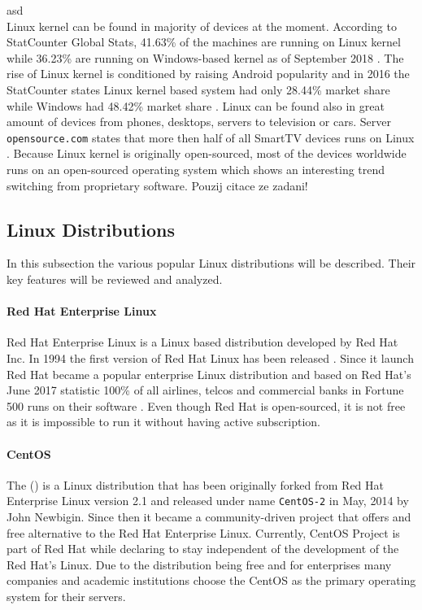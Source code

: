 asd\\
Linux kernel can be found in majority of devices at the moment. According to StatCounter Global Stats, 41.63\% of the machines are running on Linux kernel while 36.23\% are running on Windows-based kernel as of September 2018 \cite{StatCounter}. The rise of Linux kernel is conditioned by raising Android popularity and in 2016 the StatCounter states Linux kernel based system had only 28.44\% market share while Windows had 48.42\% market share \cite{StatCounter}. Linux can be found also in great amount of devices from phones, desktops, servers to television or cars. Server \texttt{opensource.com} states that more then half of all SmartTV devices runs on Linux \cite{opensourcecom}. Because Linux kernel is originally open-sourced, most of the devices worldwide runs on an open-sourced operating system which shows an interesting trend switching from proprietary software.
Pouzij citace ze zadani!
\subsection{Linux Distributions}
\label{subsection:linuxdistros}
In this subsection the various popular Linux distributions will be described. Their key features will be reviewed and analyzed. 
\paragraph{Red Hat Enterprise Linux}
Red Hat Enterprise Linux is a Linux based distribution developed by Red Hat Inc. In 1994 the first version of Red Hat Linux has been released \cite{rhhistory}. Since it launch Red Hat became a popular enterprise Linux distribution and based on Red Hat's June 2017 statistic 100\% of all airlines, telcos and commercial banks in Fortune 500 runs on their software \cite{rhtrusted}. Even though Red Hat is open-sourced, it is not free as it is impossible to run it without having active subscription.
\paragraph{CentOS}
The  () is a Linux distribution that has been originally forked from Red Hat Enterprise Linux version 2.1 and released under name \texttt{CentOS-2} in May, 2014 \cite{centosfirsts} by John Newbigin. Since then it became a community-driven project that offers and free alternative to the Red Hat Enterprise Linux. Currently, CentOS Project is part of Red Hat while declaring to stay independent of the development of the Red Hat's Linux. Due to the distribution being free and for enterprises many companies and academic institutions choose the CentOS as the primary operating system for their servers.
